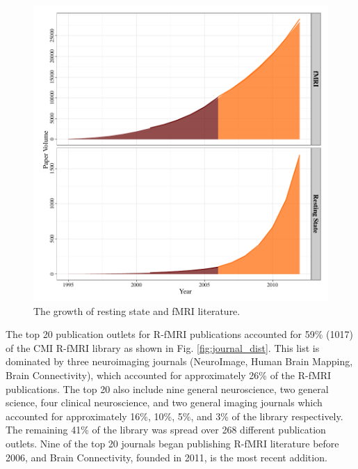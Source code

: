 \documentclass[5p]{elsarticle}
\begin{document}
\begin{figure}
  \begin{center}
    \includegraphics[width=\linewidth]{figures/overall_growth}%
    \caption{The growth of resting state and fMRI literature.
        \label{fig:overallgrowth}
    }
  \end{center}
\end{figure}


The top 20 publication outlets for R-fMRI publications accounted for 59\% (1017)
of the CMI R-fMRI library as shown in Fig. \ref{fig:journal_dist}. This list is dominated by three
neuroimaging journals (NeuroImage, Human Brain Mapping, Brain Connectivity),
which accounted for approximately 26\% of the R-fMRI publications. The top 20
also include nine general neuroscience, two general science, four clinical
neuroscience, and two general imaging journals which accounted for approximately
16\%, 10\%, 5\%, and 3\% of the library respectively. The remaining 41\% of the
library was spread over 268 different publication outlets. Nine of the top 20
journals began publishing R-fMRI literature before 2006, and Brain Connectivity,
founded in 2011, is the most recent addition.  
\end{document}
